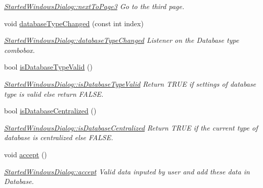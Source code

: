 \begin{DoxyCompactItemize}
\begin{DoxyCompactList}\small\item\em \hyperlink{classGui_1_1Dialogs_1_1StartedWindowsDialog_abac16c4f9fc0a3481565530fa01d8494}{Started\-Windows\-Dialog\-::next\-To\-Page3} Go to the third page. \end{DoxyCompactList}\item 
void \hyperlink{classGui_1_1Dialogs_1_1StartedWindowsDialog_a2e11f7b179785e86a86294d2d2d5357f}{database\-Type\-Changed} (const int index)
\begin{DoxyCompactList}\small\item\em \hyperlink{classGui_1_1Dialogs_1_1StartedWindowsDialog_a2e11f7b179785e86a86294d2d2d5357f}{Started\-Windows\-Dialog\-::database\-Type\-Changed} Listener on the Database type combobox. \end{DoxyCompactList}\item 
bool \hyperlink{classGui_1_1Dialogs_1_1StartedWindowsDialog_ad582a62ec4204c2ef5081c5431824491}{is\-Database\-Type\-Valid} ()
\begin{DoxyCompactList}\small\item\em \hyperlink{classGui_1_1Dialogs_1_1StartedWindowsDialog_ad582a62ec4204c2ef5081c5431824491}{Started\-Windows\-Dialog\-::is\-Database\-Type\-Valid} Return T\-R\-U\-E if settings of database type is valid else return F\-A\-L\-S\-E. \end{DoxyCompactList}\item 
bool \hyperlink{classGui_1_1Dialogs_1_1StartedWindowsDialog_ac5127ad449080835c6f3bb572fb3e481}{is\-Database\-Centralized} ()
\begin{DoxyCompactList}\small\item\em \hyperlink{classGui_1_1Dialogs_1_1StartedWindowsDialog_ac5127ad449080835c6f3bb572fb3e481}{Started\-Windows\-Dialog\-::is\-Database\-Centralized} Return T\-R\-U\-E if the current type of database is centralized else F\-A\-L\-S\-E. \end{DoxyCompactList}\item 
\hypertarget{classGui_1_1Dialogs_1_1StartedWindowsDialog_aa5da70f656530017906b5aa974fbc080}{void \hyperlink{classGui_1_1Dialogs_1_1StartedWindowsDialog_aa5da70f656530017906b5aa974fbc080}{accept} ()}\label{classGui_1_1Dialogs_1_1StartedWindowsDialog_aa5da70f656530017906b5aa974fbc080}

\begin{DoxyCompactList}\small\item\em \hyperlink{classGui_1_1Dialogs_1_1StartedWindowsDialog_aa5da70f656530017906b5aa974fbc080}{Started\-Windows\-Dialog\-::accept} Valid data inputed by user and add these data in Database. \end{DoxyCompactList}\end{DoxyCompactItemize}
